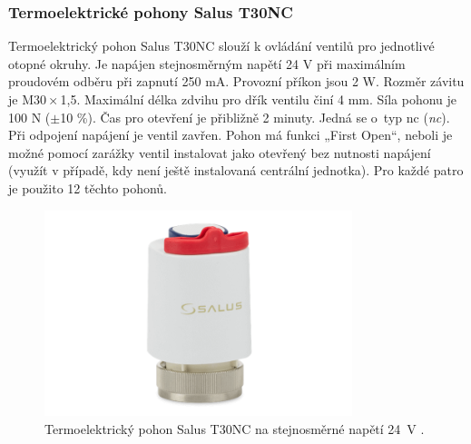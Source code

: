 \subsubsection{Termoelektrické pohony Salus T30NC}  
Termoelektrický pohon Salus T30NC slouží k ovládání ventilů pro jednotlivé otopné okruhy. Je napájen stejnosměrným napětí 24 V při maximálním proudovém odběru při zapnutí 250 mA. Provozní příkon jsou 2 W. Rozměr závitu je M30\,×\,1,5. Maximální délka zdvihu pro dřík ventilu činí 4 mm. Síla pohonu je 100 N ($\pm$10 \%). Čas pro otevření je přibližně 2 minuty. Jedná se o~typ \acrshort{nc} (\textit{\acrlong{nc}}). Při odpojení napájení je ventil zavřen. Pohon má funkci „First Open“, neboli je možné pomocí zarážky ventil instalovat jako otevřený bez nutnosti napájení (využít v případě, kdy není ještě instalovaná centrální jednotka). Pro každé patro je použito 12 těchto pohonů.

\begin{figure}[H]
    \centering
    \includegraphics[width=0.8\textwidth]{images/termoelektricky-pohon-salus-t30nc-24-v.png}
    \caption[Termoelektrický pohon Salus T30NC.]{Termoelektrický pohon Salus T30NC na stejnosměrné napětí 24~V \cite{termoelektricky-pohon-t30nc}.}
    \label{fig:termoelektricky-pohon-salus-t30nc-24-v}
\end{figure}